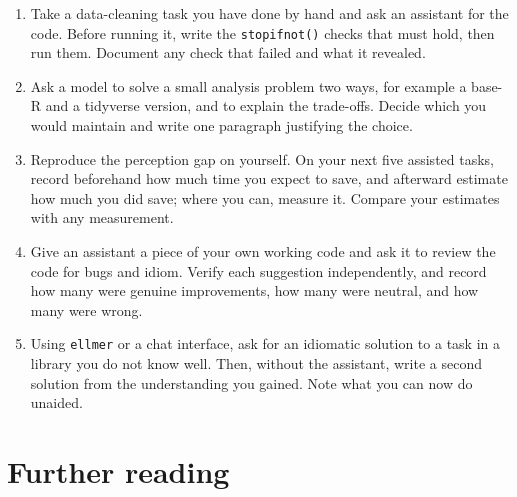 \documentclass[
  letterpaper,
  11pt]{scrbook}
\begin{document}
\begin{enumerate}
\def\labelenumi{\arabic{enumi}.}
\item
  Take a data-cleaning task you have done by hand and ask an assistant
  for the code. Before running it, write the \texttt{stopifnot()} checks
  that must hold, then run them. Document any check that failed and what
  it revealed.
\item
  Ask a model to solve a small analysis problem two ways, for example a
  base-R and a tidyverse version, and to explain the trade-offs. Decide
  which you would maintain and write one paragraph justifying the
  choice.
\item
  Reproduce the perception gap on yourself. On your next five assisted
  tasks, record beforehand how much time you expect to save, and
  afterward estimate how much you did save; where you can, measure it.
  Compare your estimates with any measurement.
\item
  Give an assistant a piece of your own working code and ask it to
  review the code for bugs and idiom. Verify each suggestion
  independently, and record how many were genuine improvements, how many
  were neutral, and how many were wrong.
\item
  Using \texttt{ellmer} or a chat interface, ask for an idiomatic
  solution to a task in a library you do not know well. Then, without
  the assistant, write a second solution from the understanding you
  gained. Note what you can now do unaided.
\end{enumerate}

\section{Further reading}\label{further-reading-3}
\end{document}

